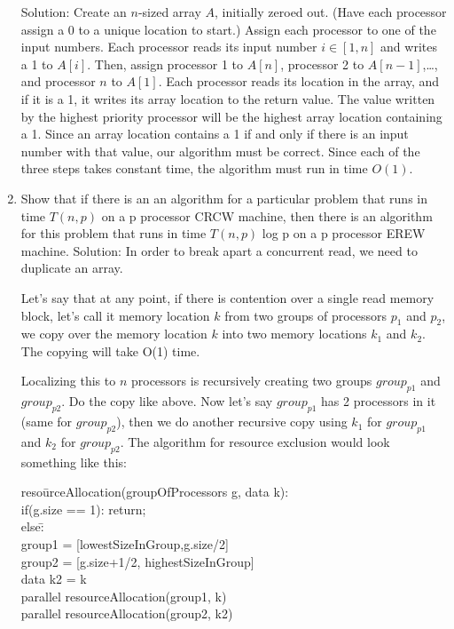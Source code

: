 \documentclass{article}
\begin{document}
\begin{enumerate}
\newline
\newline Solution: Create an $n$-sized array $A$, initially zeroed out. (Have each processor assign a 0 to a unique location to start.) Assign each processor to one of the input numbers. Each processor reads its input number $i\in[1,n]$ and writes a 1 to $A[i]$. Then, assign processor 1 to $A[n]$, processor 2 to $A[n-1]$,\ldots , and processor $n$ to $A[1]$. Each processor reads its location in the array, and if it is a 1, it writes its array location to the return value. The value written by the highest priority processor will be the highest array location containing a 1. Since an array location contains a 1 if and only if there is an input number with that value, our algorithm must be correct. Since each of the three steps takes constant time, the algorithm must run in time $O(1)$.
\newline
\setcounter{enumi}{19}
\item Show that if there is an an algorithm for a particular problem that runs in time $T(n, p)$ on a p
\newline processor CRCW machine, then there is an algorithm for this problem that runs in time $T(n, p)$ log p
on a p processor EREW machine.
\newline
Solution: In order to break apart a concurrent read, we need to duplicate an array. 

Let's say that at any point, if there is contention over a single read memory block, let's call it memory location $k$ from two groups of processors $p_1$ and $p_2$, we copy over the memory location $k$ into two memory locations $k_1$ and $k_2$. The copying will take O(1) time. 

Localizing this to $n$ processors is recursively creating two groups $group_{p1}$ and $group_{p2}$. Do the copy like above. Now let's say $group_{p1}$ has 2 processors in it (same for $group_{p2}$), then we do another recursive copy using $k_1$ for $group_{p1}$ and $k_2$ for $group_{p2}$. The algorithm for resource exclusion would look something like this:

\begin{tabbing}
reso\=urceAllocation(groupOfProcessors g, data k):\\
\>if(g.size == 1): return;\\
\>else\=:\\
\>\>group1 = [lowestSizeInGroup,g.size/2]\\
\>\>group2 = [g.size+1/2, highestSizeInGroup]\\
\>\>data k2 = k\\
\>\>parallel resourceAllocation(group1, k)\\
\>\>parallel resourceAllocation(group2, k2)\\
\end{tabbing}


\end{enumerate}
\end{document}
